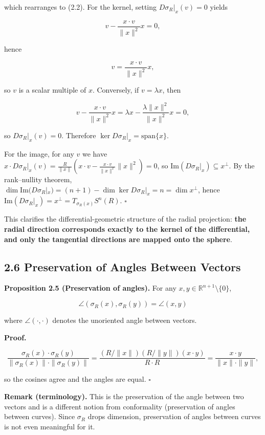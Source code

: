 \documentclass[
]{ltjsarticle}
\begin{document}
which rearranges to (2.2). For the kernel, setting
\(D\sigma_R|_x(v) = 0\) yields

\[v - \frac{x \cdot v}{\|x\|^2} x = 0,\]

hence

\[v = \frac{x \cdot v}{\|x\|^2} x,\]

so \(v\) is a scalar multiple of \(x\). Conversely, if
\(v = \lambda x\), then

\[v - \frac{x \cdot v}{\|x\|^2} x = \lambda x - \frac{\lambda \|x\|^2}{\|x\|^2} x = 0,\]

so \(D\sigma_R|_x(v) = 0\). Therefore
\(\ker D\sigma_R|_x = \mathrm{span}\{x\}\).

For the image, for any \(v\) we have
\(x \cdot D\sigma_R|_x(v) = \frac{R}{\|x\|}\left(x \cdot v - \frac{x \cdot v}{\|x\|^2}\|x\|^2\right) = 0\),
so \(\mathrm{Im}(D\sigma_R|_x) \subseteq x^\perp\). By the rank--nullity
theorem,
\(\dim \mathrm{Im}(D\sigma_R|_x) = (n+1) - \dim \ker D\sigma_R|_x = n = \dim x^\perp\),
hence \(\mathrm{Im}(D\sigma_R|_x) = x^\perp = T_{\sigma_R(x)} S^n(R)\).
\(\square\)

This clarifies the differential-geometric structure of the radial
projection: \textbf{the radial direction corresponds exactly to the
kernel of the differential, and only the tangential directions are
mapped onto the sphere}.

\subsection{2.6 Preservation of Angles Between
Vectors}\label{preservation-of-angles-between-vectors}

\textbf{Proposition 2.5 (Preservation of angles).} For any
\(x, y \in \mathbb{R}^{n+1} \setminus \{0\}\),

\[\angle(\sigma_R(x), \sigma_R(y)) = \angle(x, y) \tag{2.5}\]

where \(\angle(\cdot, \cdot)\) denotes the unoriented angle between
vectors.

\textbf{Proof.}

\[\frac{\sigma_R(x) \cdot \sigma_R(y)}{\|\sigma_R(x)\| \cdot \|\sigma_R(y)\|} = \frac{(R/\|x\|)(R/\|y\|)(x \cdot y)}{R \cdot R} = \frac{x \cdot y}{\|x\| \cdot \|y\|},\]

so the cosines agree and the angles are equal. \(\square\)

\textbf{Remark (terminology).} This is the preservation of the angle
between two vectors and is a different notion from conformality
(preservation of angles between curves). Since \(\sigma_R\) drops
dimension, preservation of angles between curves is not even meaningful
for it.
\end{document}
